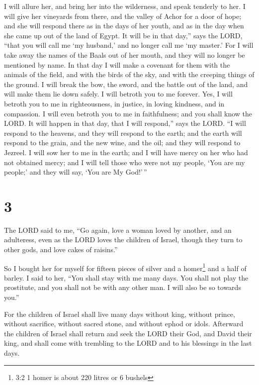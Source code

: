 I will allure her, and bring her into the wilderness, and speak tenderly
to her.  I will give her vineyards from there, and the
valley of Achor for a door of hope; and she will respond there as in the
days of her youth, and as in the day when she came up out of the land of
Egypt.  It will be in that day,'' says the LORD, ``that you
will call me `my husband,' and no longer call me `my master.'
 For I will take away the names of the Baals out of her
mouth, and they will no longer be mentioned by name.  In
that day I will make a covenant for them with the animals of the field,
and with the birds of the sky, and with the creeping things of the
ground. I will break the bow, the sword, and the battle out of the land,
and will make them lie down safely.  I will betroth you to
me forever. Yes, I will betroth you to me in righteousness, in justice,
in loving kindness, and in compassion.  I will even betroth
you to me in faithfulness; and you shall know the LORD.  It
will happen in that day, that I will respond,'' says the LORD. ``I will
respond to the heavens, and they will respond to the earth;
 and the earth will respond to the grain, and the new wine,
and the oil; and they will respond to Jezreel.  I will sow
her to me in the earth; and I will have mercy on her who had not
obtained mercy; and I will tell those who were not my people, `You are
my people;' and they will say, `You are My God!'\,''

\hypertarget{section-2}{%
\section{3}\label{section-2}}

 The LORD said to me, ``Go again, love a woman loved by
another, and an adulteress, even as the LORD loves the children of
Israel, though they turn to other gods, and love cakes of raisins.''

 So I bought her for myself for fifteen pieces of silver and
a homer\footnote{3:2 1 homer is about 220 litres or 6 bushels} and a
half of barley.  I said to her, ``You shall stay with me
many days. You shall not play the prostitute, and you shall not be with
any other man. I will also be so towards you.''

 For the children of Israel shall live many days without
king, without prince, without sacrifice, without sacred stone, and
without ephod or idols.  Afterward the children of Israel
shall return and seek the LORD their God, and David their king, and
shall come with trembling to the LORD and to his blessings in the last
days.

